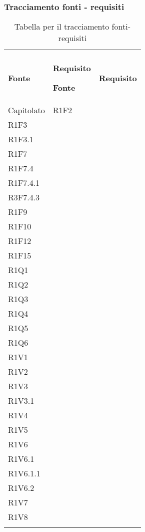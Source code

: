 \subsubsection{Tracciamento fonti - requisiti}

\renewcommand{\arraystretch}{2.2}

\begin{longtable}{|C{6.5cm}|C{6.5cm}|}

	\caption{Tabella per il tracciamento fonti-requisiti}\\
	\textbf{Fonte} & \textbf{Requisito}
	\endfirsthead

	\hline
	\textbf{Fonte} & \textbf{Requisito}
	\tabularnewline
	\endhead

	Capitolato &
	\centering
	R1F2\\
	R1F3 \\
	R1F3.1\\
	R1F7\\
	R1F7.4\\
	R1F7.4.1\\
	R3F7.4.3\\
	R1F9\\
	R1F10\\
	R1F12\\
	R1F15\\
	R1Q1\\
	R1Q2\\
	R1Q3\\
	R1Q4\\
	R1Q5\\
	R1Q6\\
	R1V1\\
	R1V2\\
	R1V3\\
	R1V3.1\\
	R1V4\\
	R1V5\\
	R1V6\\
	R1V6.1\\
	R1V6.1.1\\
	R1V6.2\\
	R1V7\\
	R1V8\\

	\tabularnewline


\end{longtable}
